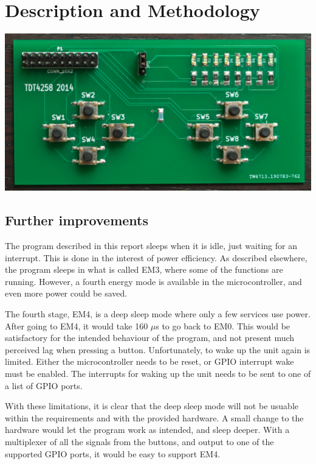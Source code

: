 \section{Description and Methodology}

\includegraphics{figures/gamepad.png}



\subsection{Further improvements}
The program described in this report sleeps when it is idle, just waiting for an interrupt.
This is done in the interest of power efficiency.
As described elsewhere, the program sleeps in what is called EM3, where some of the functions are running.
However, a fourth energy mode is available in the microcontroller, and even more power could be saved.

The fourth stage, EM4, is a deep sleep mode where only a few services use power.
After going to EM4, it would take 160 $\mu$s to go back to EM0.
This would be satisfactory for the intended behaviour of the program, and not present much perceived lag when pressing a button.
Unfortunately, to wake up the unit again is limited.
Either the microcontroller needs to be reset, or GPIO interrupt wake must be enabled.
The interrupts for waking up the unit needs to be sent to one of a list of GPIO ports.\cite{referencemanual}

With these limitations, it is clear that the deep sleep mode will not be usuable within the requirements and with the provided hardware.
A small change to the hardware would let the program work as intended, and sleep deeper.
With a multiplexer of all the signals from the buttons, and output to one of the supported GPIO ports, it would be easy to support EM4.
